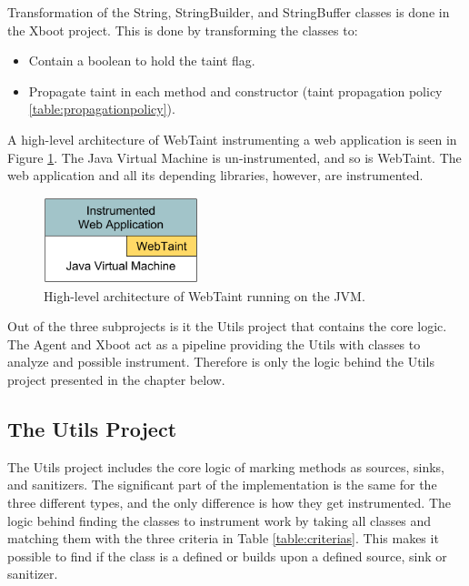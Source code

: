 Transformation of the String, StringBuilder, and StringBuffer classes is done in the Xboot project. This is done by transforming the classes to: 

\hfill
\begin{itemize}
    \item Contain a boolean to hold the taint flag.
    \item Propagate taint in each method and constructor (taint propagation policy \ref{table:propagationpolicy}).
\end{itemize}
\hfill

A high-level architecture of WebTaint instrumenting a web application is seen in Figure \ref{fig:WebTaint}. The Java Virtual Machine is un-instrumented, and so is WebTaint. The web application and all its depending libraries, however, are instrumented.

\begin{figure}[H]
    \centering
    \includegraphics[width=0.4\textwidth]{images/WebTaintArchitecture.png}
    \caption{High-level architecture of WebTaint running on the JVM.}
    \label{fig:WebTaint}
\end{figure}

Out of the three subprojects is it the Utils project that contains the core logic. The Agent and Xboot act as a pipeline providing the Utils with classes to analyze and possible instrument. Therefore is only the logic behind the Utils project presented in the chapter below.

\subsection{The Utils Project}
The Utils project includes the core logic of marking methods as sources, sinks, and sanitizers. The significant part of the implementation is the same for the three different types, and the only difference is how they get instrumented. The logic behind finding the classes to instrument work by taking all classes and matching them with the three criteria in Table \ref{table:criterias}. This makes it possible to find if the class is a defined or builds upon a defined source, sink or sanitizer.

